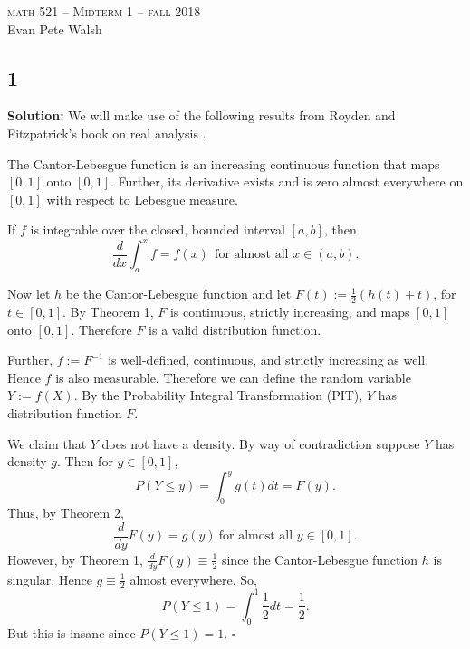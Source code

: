 \documentclass[12pt]{article}
\newcounter{ProofCounter}
\newenvironment{Solution}{\stepcounter{ProofCounter}\textbf{Solution:}}{\hfill$\square$}
\begin{document}
\thispagestyle{empty}
\begin{center}
  \Large \textsc{math 521 -- Midterm 1 -- fall 2018} \\ 
  \vspace{5mm}
  \large Evan Pete Walsh
\end{center}


\subsection*{1}
\begin{Solution}
  We will make use of the following results from Royden and Fitzpatrick's book on real analysis \cite{RF}. \\

  \begin{Theorem}
    The Cantor-Lebesgue function is an increasing continuous function that maps $[0, 1]$ onto $[0, 1]$. Further, its derivative exists and is zero almost everywhere on $[0, 1]$ with respect to Lebesgue measure.
  \end{Theorem}

  \vspace{5mm}

  \begin{Theorem}
    If $f$ is integrable over the closed, bounded interval $[a, b]$, then
    \[
      \frac{d}{dx} \int_{a}^{x} f = f(x) \ \ \text{for almost all $x \in (a, b)$}.
    \]
  \end{Theorem}

  \vspace{5mm}

  Now let $h$ be the Cantor-Lebesgue function and let $F(t) := \frac{1}{2}(h(t) + t)$, for $t \in [0, 1]$. By Theorem 1, $F$ is continuous, strictly increasing, and maps $[0, 1]$ onto $[0, 1]$. Therefore $F$ is a valid distribution function.
  
  Further, $f := F^{-1}$ is well-defined, continuous, and strictly increasing as well. Hence $f$ is also measurable. Therefore we can define the random variable $Y := f(X)$. By the Probability Integral Transformation (PIT), $Y$ has distribution function $F$.

  We claim that $Y$ does not have a density. By way of contradiction suppose $Y$ has density $g$. Then for $y \in [0, 1]$,
  \[
    P(Y \leq y) = \int_{0}^{y} g(t) dt = F(y).
  \]
  Thus, by Theorem 2,
  \[
    \frac{d}{dy} F(y) = g(y) \ \text{for almost all $y \in [0, 1]$}.
  \]
  However, by Theorem 1, $\frac{d}{dy} F(y) \equiv \frac{1}{2}$ since the Cantor-Lebesgue function $h$ is singular. Hence $g \equiv \frac{1}{2}$ almost everywhere.
  So,
  \[
    P(Y \leq 1) = \int_{0}^{1} \frac{1}{2} dt = \frac{1}{2}.
  \]
  But this is insane since $P(Y \leq 1) = 1$.
\end{Solution}
\end{document}
